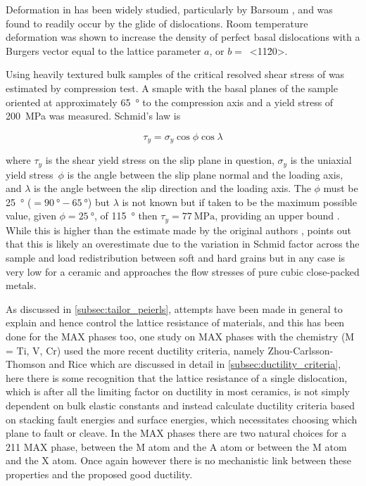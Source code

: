 Deformation in  has been widely studied, particularly by Barsoum \cite{Farber1998,Barsoum1999,Farber1999,Barsoum1999dislocs_kinkbands,Barsoum2001}, and was found to readily occur by the glide of dislocations. Room temperature deformation was shown to increase the density of perfect basal dislocations with a Burgers vector equal to the lattice parameter $a$, or $b =$~<11\={2}0>. 

Using heavily textured bulk samples of  the critical resolved shear stress of  was estimated by compression test. A smaple with the basal planes of the sample oriented at approximately \SI{65}{\degree} to the compression axis and a yield stress of \SI{200}{\mega\pascal} was measured. Schmid's law is 

\begin{equation}
\tau_y = \sigma_y \cos{\phi} \cos{\lambda}
\end{equation}

where $\tau_y$ is the shear yield stress on the slip plane in question, $\sigma_y$ is the uniaxial yield stress\ $\phi$ is the angle between the slip plane normal and the loading axis, and $\lambda$ is the angle between the slip direction and the loading axis. The $\phi$ must be \SI{25}{\degree} ($=\SI{90}{\degree} - \SI{65}{\degree}$) but $\lambda$ is not known but if taken to be the maximum possible value, given $\phi=\SI{25}{\degree}$, of \SI{115}{\degree} then $\tau_y = \SI{77}{\mega\pascal}$, providing an upper bound \cite{Humphrey2012}. While this is higher than the estimate made by the original authors \cite{Barsoum1999}, \citet{Humphrey2012} points out that this is likely an overestimate due to the variation in Schmid factor across the sample and load redistribution between soft and hard grains but in any case is very low for a ceramic and approaches the flow stresses of pure cubic close-packed metals.


%
%
%
%
%
%
%
%
%
%
%
%


As discussed in \autoref{subsec:tailor_peierls}, attempts have been made in general to explain and hence control the lattice resistance of materials, and this has been done for the MAX phases too, one study on MAX phases \cite{Music2007ductility} with the chemistry  (M = Ti, V, Cr) used the more recent ductility criteria, namely Zhou-Carlsson-Thomson \cite{Zhou1994} and Rice \cite{Rice1992} which are discussed in detail in \autoref{subsec:ductility_criteria}, here there is some recognition that the lattice resistance of a single dislocation, which is after all the limiting factor on ductility in most ceramics, is not simply dependent on bulk elastic constants and instead calculate ductility criteria based on stacking fault energies and surface energies, which necessitates choosing which plane to fault or cleave. In the MAX phases there are two natural choices for a 211 MAX phase, between the M atom and the A atom or between the M atom and the X atom. Once again however there is no mechanistic link between these properties and the proposed good ductility. 


